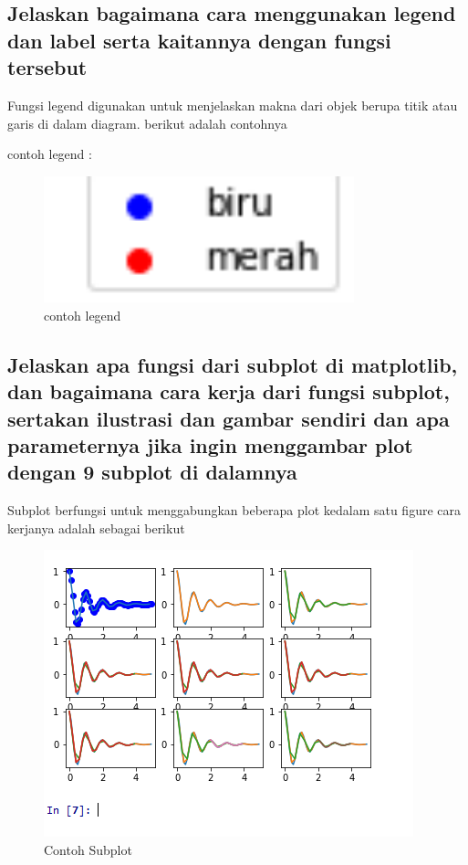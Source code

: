 \subsection{Jelaskan bagaimana cara menggunakan legend dan label serta kaitannya dengan fungsi tersebut}
Fungsi legend digunakan untuk menjelaskan makna dari objek berupa titik atau garis di dalam diagram.
berikut adalah contohnya 

contoh legend :
\begin{figure}[H]
    \includegraphics[width=9cm]{figures/6/Teori/1174038/6.png}
    \caption{contoh legend}
    \centering
\end{figure}

\subsection{Jelaskan apa fungsi dari subplot di matplotlib, dan bagaimana cara kerja dari fungsi subplot, sertakan ilustrasi dan gambar sendiri dan apa parameternya jika ingin menggambar plot dengan 9 subplot di dalamnya}
Subplot berfungsi untuk menggabungkan beberapa plot kedalam satu figure
cara kerjanya adalah sebagai berikut


\begin{figure}[h]
\centering
\includegraphics[scale=0.7]{figures/6/Teori/1174038/subplot.png}
\caption{Contoh Subplot}
\label{fig:contoh subplot}
\end{figure}


